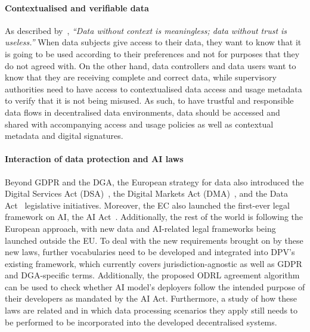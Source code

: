 \paragraph{Contextualised and verifiable data} As described by~\cite{verborgh_rawdata_2023}, \textit{``Data without context is meaningless; data without trust is useless.''} When data subjects give access to their data, they want to know that it is going to be used according to their preferences and not for purposes that they do not agreed with. On the other hand, data controllers and data users want to know that they are receiving complete and correct data, while supervisory authorities need to have access to contextualised data access and usage metadata to verify that it is not being misused. As such, to have trustful and responsible data flows in decentralised data environments, data should be accessed and shared with accompanying access and usage policies as well as contextual metadata and digital signatures.

\paragraph{Interaction of data protection and AI laws}
Beyond GDPR and the DGA, the European strategy for data also introduced the Digital Services Act (DSA)~\citeyearpar{noauthor_dsa_2022}, the Digital Markets Act (DMA)~\citeyearpar{noauthor_dma_2022}, and the Data Act~\citeyearpar{noauthor_dataact_2022} legislative initiatives.
Moreover, the EC also launched the first-ever legal framework on AI, the AI Act~\citeyearpar{noauthor_proposal_2021}.
Additionally, the rest of the world is following the European approach, with new data and AI-related legal frameworks being launched outside the EU.
To deal with the new requirements brought on by these new laws, further vocabularies need to be developed and integrated into DPV's existing framework, which currently covers jurisdiction-agnostic as well as GDPR and DGA-specific terms.
Additionally, the proposed ODRL agreement algorithm can be used to check whether AI model's deployers follow the intended purpose of their developers as mandated by the AI Act.
Furthermore, a study of how these laws are related and in which data processing scenarios they apply still needs to be performed to be incorporated into the developed decentralised systems.